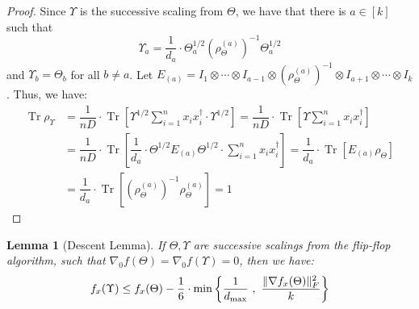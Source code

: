 \documentclass[aos]{imsart}
\newtheorem{lemma}[theorem]{Lemma}
\theoremstyle{definition}
\numberwithin{equation}{section}
\DeclareMathOperator{\tr}{Tr}
\DeclarePairedDelimiter{\norm}{\lVert}{\rVert}
\def\dmax{d_{\max}}
\begin{document}
\begin{proof}
	Since $\Upsilon$ is the successive scaling from $\Theta$, we have that
	there is $a \in [k]$ such that
	$$\Upsilon_a = \dfrac{1}{d_a} \cdot \Theta_a^{1/2} (\rho_\Theta^{(a)})^{-1} \Theta_a^{1/2} $$
	and $\Upsilon_b = \Theta_b$ for all $b \neq a$. Let $E_{(a)} = I_1 \otimes \cdots \otimes I_{a-1} \otimes (\rho_\Theta^{(a)})^{-1} \otimes I_{a+1} \otimes \cdots \otimes I_k$.
	Thus, we have:
	\begin{align*}
		\tr \rho_\Upsilon 
		&= \dfrac{1}{nD} \cdot \tr\left[ \Upsilon^{1/2} \sum_{i=1}^n x_i x_i^\dagger \cdot \Upsilon^{1/2} \right] 
		= \dfrac{1}{nD} \cdot \tr\left[ \Upsilon \sum_{i=1}^n x_i x_i^\dagger \right] \\
		&= \dfrac{1}{nD} \cdot \tr\left[ \dfrac{1}{d_a} \cdot \Theta^{1/2} E_{(a)} \Theta^{1/2} \cdot \sum_{i=1}^n x_i x_i^\dagger \right] 
		= \dfrac{1}{d_a} \cdot \tr\left[ E_{(a)} \rho_\Theta \right] \\
		&= \dfrac{1}{d_a} \cdot \tr\left[ (\rho_\Theta^{(a)})^{-1} \rho_\Theta^{(a)} \right] = 1
	\end{align*}
\end{proof}

\begin{lemma}[Descent Lemma]\label{lem:tensor-descent-lemma}
	If $\Theta, \Upsilon$ are successive scalings from the flip-flop algorithm, such that $\nabla_0 f(\Theta) = \nabla_0 f(\Upsilon) = 0$, then we have:
	$$ f_x(\Upsilon) \leq f_x(\Theta) - \dfrac{1}{6} \cdot \min\left\{ \dfrac{1}{\dmax} \ , \ \dfrac{\norm{\nabla f_x(\Theta)}_F^2}{k} \right\} $$
\end{lemma}
\end{document}
